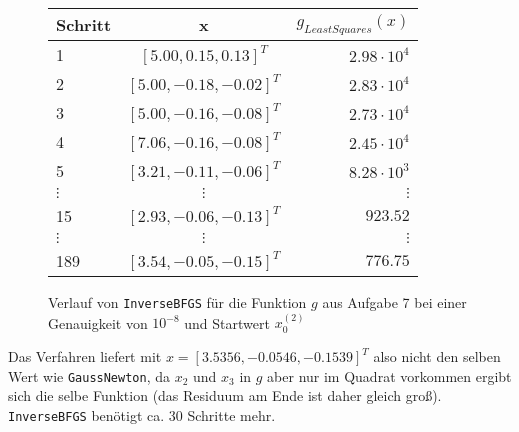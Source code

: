 \documentclass[a4paper, 12pt]{report}
\begin{document}
\begin{figure}[H]
  \centering
  \def\arraystretch{1.25}
  \begin{tabular}{l|c|r}
    \hline
    \textbf{Schritt} & \textbf{x} & \textbf{$g_{LeastSquares}(x)$}\\
    \hline
    1 & $[5.00, 0.15, 0.13]^T$ & $2.98 \cdot 10^4$\\
    2 & $[5.00, -0.18, -0.02]^T$ & $2.83 \cdot 10^4$\\
    3 & $[5.00, -0.16, -0.08]^T$ & $2.73 \cdot 10^4$\\
    4 & $[7.06, -0.16, -0.08]^T$ & $2.45 \cdot 10^4$\\
    5 & $[3.21, -0.11, -0.06]^T$ & $8.28 \cdot 10^3$\\
    $\vdots$ & $\vdots$ & $\vdots$\\
    15 & $[2.93, -0.06, -0.13]^T$ & $923.52$\\
    $\vdots$ & $\vdots$ & $\vdots$\\
    189 & $[3.54, -0.05, -0.15]^T$ & $776.75$\\
    \hline
  \end{tabular}
  \caption{Verlauf von \lstinline[basicstyle=\ttfamily\color{black}]|InverseBFGS| für die Funktion $g$ aus Aufgabe 7 bei einer Genauigkeit von
          $10^{-8}$ und Startwert $x_0^{(2)}$}
\end{figure}

Das Verfahren liefert mit $x = [3.5356, -0.0546, -0.1539]^T$ also nicht den selben Wert wie
\lstinline[basicstyle=\ttfamily\color{black}]|GaussNewton|, da $x_2$ und $x_3$ in $g$ aber nur im Quadrat vorkommen ergibt sich die
selbe Funktion (das Residuum am Ende ist daher gleich groß). \lstinline[basicstyle=\ttfamily\color{black}]|InverseBFGS| benötigt ca.
30 Schritte mehr.
\end{document}
